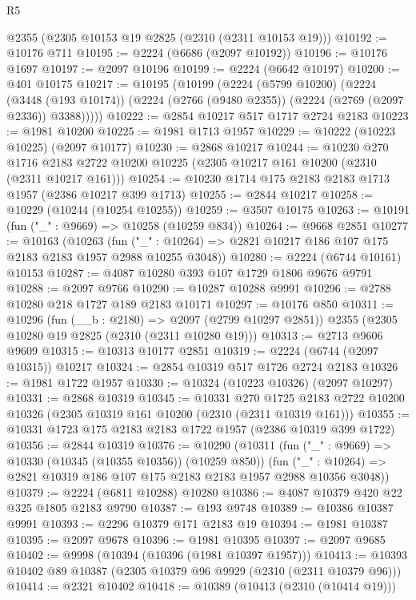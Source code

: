 \begin{lexlean}{R5}
\begin{coremodule}
    @2355
    (@2305 @10153 @19 @2825 (@2310 (@2311 @10153 @19)))
@10192 := @10176 @711
@10195 := @2224 (@6686 (@2097 @10192))
@10196 := @10176 @1697
@10197 := @2097 @10196
@10199 := @2224 (@6642 @10197)
@10200 := @401 @10175
@10217 := @10195
    (@10199
      (@2224
        (@5799 @10200)
        (@2224
          (@3448 (@193 @10174))
          (@2224 (@2766 (@9480 @2355)) (@2224 (@2769 (@2097 @2336)) @3388)))))
@10222 := @2854 @10217 @517 @1717 @2724 @2183
@10223 := @1981 @10200
@10225 := @1981 @1713 @1957
@10229 := @10222 (@10223 @10225) (@2097 @10177)
@10230 := @2868 @10217
@10244 := @10230
    @270
    @1716
    @2183
    @2722
    @10200
    @10225
    (@2305 @10217 @161 @10200 (@2310 (@2311 @10217 @161)))
@10254 := @10230 @1714 @175 @2183 @2183 @1713 @1957 (@2386 @10217 @399 @1713)
@10255 := @2844 @10217
@10258 := @10229 (@10244 (@10254 @10255))
@10259 := @3507 @10175
@10263 := @10191 (fun ("_" : @9669) => @10258 (@10259 @834))
@10264 := @9668 @2851
@10277 := @10163
    (@10263
      (fun ("_" : @10264) => @2821 @10217 @186 @107 @175 @2183 @2183 @1957 @2988 @10255 @3048))
@10280 := @2224 (@6744 @10161) @10153
@10287 := @4087 @10280 @393 @107 @1729 @1806 @9676 @9791
@10288 := @2097 @9766
@10290 := @10287 @10288 @9991
@10296 := @2788 @10280 @218 @1727 @189 @2183 @10171
@10297 := @10176 @850
@10311 := @10296
    (fun (__b : @2180) => @2097 (@2799 @10297 @2851))
    @2355
    (@2305 @10280 @19 @2825 (@2310 (@2311 @10280 @19)))
@10313 := @2713 @9606 @9609
@10315 := @10313 @10177 @2851
@10319 := @2224 (@6744 (@2097 @10315)) @10217
@10324 := @2854 @10319 @517 @1726 @2724 @2183
@10326 := @1981 @1722 @1957
@10330 := @10324 (@10223 @10326) (@2097 @10297)
@10331 := @2868 @10319
@10345 := @10331
    @270
    @1725
    @2183
    @2722
    @10200
    @10326
    (@2305 @10319 @161 @10200 (@2310 (@2311 @10319 @161)))
@10355 := @10331 @1723 @175 @2183 @2183 @1722 @1957 (@2386 @10319 @399 @1722)
@10356 := @2844 @10319
@10376 := @10290
    (@10311
      (fun ("_" : @9669) => @10330 (@10345 (@10355 @10356)) (@10259 @850))
      (fun ("_" : @10264) => @2821 @10319 @186 @107 @175 @2183 @2183 @1957 @2988 @10356 @3048))
@10379 := @2224 (@6811 @10288) @10280
@10386 := @4087 @10379 @420 @22 @325 @1805 @2183 @9790
@10387 := @193 @9748
@10389 := @10386 @10387 @9991
@10393 := @2296 @10379 @171 @2183 @19
@10394 := @1981 @10387
@10395 := @2097 @9678
@10396 := @1981 @10395
@10397 := @2097 @9685
@10402 := @9998 (@10394 (@10396 (@1981 @10397 @1957)))
@10413 := @10393 @10402 @89 @10387 (@2305 @10379 @96 @9929 (@2310 (@2311 @10379 @96)))
@10414 := @2321 @10402
@10418 := @10389 (@10413 (@2310 (@10414 @19)))

\end{coremodule}
\end{lexlean}
